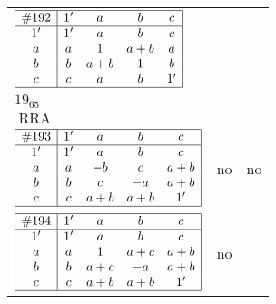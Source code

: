 \documentclass[12pt]{article}
\theoremstyle{definition}
\newcommand\RRA{\operatorname{RRA}}
\newcommand{\join}{\mathbin{+}}%
\newcommand{\id}{{1'}}%
\renewcommand{\top}{1}%
\begin{document}
\begin{center}
\begin{longtable}{l|c|c}
$
\begin{array}{|c|cccc|} \hline
\#192 & \id & a & b & c \\ \hline
\id & \id & a & b & c \\
a & a & \top & a \join b & a \\
b & b & a \join b & \top & b \\
c & c & a & b & \id \\ \hline
\end{array}
$
 & \begin{tabular}{c} yes \\ $19_{65}$ \\ $\RRA$ \end{tabular} 
 & \adjustbox{valign=c, max height=1.6cm}{$
\left[ \begin{array}{cccccc}
\id & a & a & b & c & b \\ 
a & \id & a & a & a & b \\ 
a & a & \id & b & a & b \\ 
b & a & b & \id & b & b \\ 
c & a & a & b & \id & b \\ 
b & b & b & b & b & \id
\end{array}\right]
$}      \\[15mm]

$
\begin{array}{|c|cccc|} \hline
\#193 & \id & a & b & c \\ \hline
\id & \id & a & b & c \\
a & a & -b & c & a \join b \\
b & b & c & -a & a \join b \\
c & c & a \join b & a \join b & \id \\ \hline
\end{array}
$
 & no  
 & no      \\[15mm]

$
\begin{array}{|c|cccc|} \hline
\#194 & \id & a & b & c \\ \hline
\id & \id & a & b & c \\
a & a & \top & a \join c & a \join b \\
b & b & a \join c & -a & a \join b \\
c & c & a \join b & a \join b & \id \\ \hline
\end{array}
$
 & no  
 & \adjustbox{valign=c, max height=1.6cm}{$
\left[ \begin{array}{cccccc}
\id & a & a & b & c & b \\ 
a & \id & a & a & a & c \\ 
a & a & \id & c & a & a \\ 
b & a & c & \id & b & b \\ 
c & a & a & b & \id & b \\ 
b & c & a & b & b & \id
\end{array}\right]
$}      \\[15mm]


\end{longtable}
\end{center}
\end{document}

